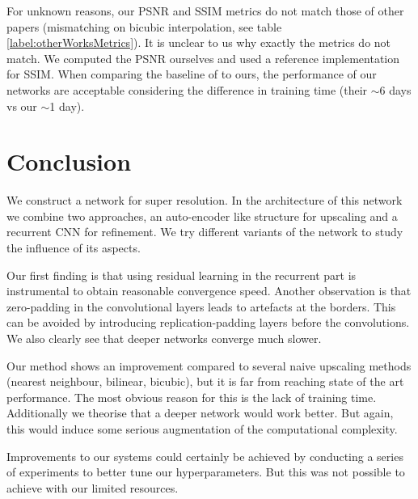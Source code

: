 \documentclass[11pt]{article}
\begin{document}
For unknown reasons, our PSNR and SSIM metrics do not match those of other papers (mismatching on bicubic interpolation, see table \ref{label:otherWorksMetrics}). It is unclear to us why exactly the metrics do not match. 
We computed the PSNR ourselves and used a reference implementation for SSIM.
When comparing the baseline of \citet{kim2016deeply} to ours, the performance of our networks are acceptable considering the difference in training time (their $\sim$6 days vs our $\sim$1 day).

\newpage
\section{Conclusion}

We construct a network for super resolution. In the architecture of this network we combine two approaches, an auto-encoder like structure for upscaling and a recurrent CNN for refinement. We try different variants of the network to study the influence of its aspects.

Our first finding is that using residual learning in the recurrent part is instrumental to obtain reasonable convergence speed. Another observation is that zero-padding in the convolutional layers leads to artefacts at the borders. This can be avoided by introducing replication-padding layers before the convolutions. We also clearly see that deeper networks converge much slower.

Our method shows an improvement compared to several naive upscaling methods (nearest neighbour, bilinear, bicubic), but it is far from reaching state of the art performance.
The most obvious reason for this is the lack of training time. Additionally we theorise that a deeper network would work better. But again, this would induce some serious augmentation of the computational complexity.

Improvements to our systems could certainly be achieved by conducting a series of experiments to better tune our hyperparameters. But this was not possible to achieve with our limited resources.







\printbibliography[heading=bibintoc]
\end{document}
